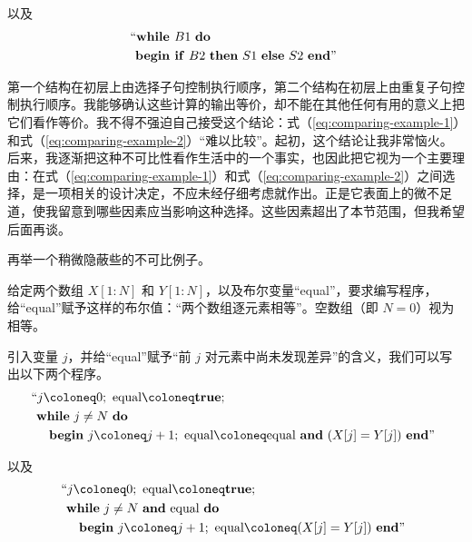 \documentclass[twoside,11pt,fontset=none]{ctexbook}
\begin{document}
\noindent
以及
\begin{equation}
	\label{eq:comparing-example-2}
	\begin{split}
		&\text{\hspace{-.4em}``\textbf{while }} B1\text{ \textbf{do}}\\
		&\text{\textbf{begin if} } B2\text{ \textbf{then} } S1\text{ \textbf{else} } S2\text{ \textbf{end}''}
	\end{split}
\end{equation}

\label{pg:dilema}
第一个结构在初层上由选择子句控制执行顺序，第二个结构在初层上由重复子句控制执行顺序。我能够确认这些计算的输出等价，却不能在其他任何有用的意义上把它们看作等价。我不得不强迫自己接受这个结论：式（\ref{eq:comparing-example-1}）和式（\ref{eq:comparing-example-2}）“难以比较”。起初，这个结论让我非常恼火。后来，我逐渐把这种不可比性看作生活中的一个事实，也因此把它视为一个主要理由：在式（\ref{eq:comparing-example-1}）和式（\ref{eq:comparing-example-2}）之间选择，是一项相关的设计决定，不应未经仔细考虑就作出。正是它表面上的微不足道，使我留意到哪些因素应当影响这种选择。这些因素超出了本节范围，但我希望后面再谈。

再举一个稍微隐蔽些的不可比例子。

给定两个数组 $X[1:N]$ 和 $Y[1:N]$，以及布尔变量“equal”，要求编写程序，给“equal”赋予这样的布尔值：“两个数组逐元素相等”。空数组（即 $N = 0$）视为相等。

引入变量 $j$，并给“equal”赋予“前 $j$ 对元素中尚未发现差异”的含义，我们可以写出以下两个程序。
\begin{equation}
	\label{eq:comparing-example-3}
	\begin{split}
		&\text{\hspace{-.4em}``}j \coloneq 0;\text{ equal} \coloneq \text{\textbf{true}};\\
		&\text{\textbf{while} } j \neq N\text{ \textbf{do}}\\
		&\quad\text{\textbf{begin} } j \coloneq  j + 1;\text{ equal} \coloneq \text{equal \textbf{and} } (X[j] = Y[j]) \text{ \textbf{end}''}
	\end{split}
\end{equation}

\noindent
以及
\begin{equation}
	\label{eq:comparing-example-4}
	\begin{split}
		&\text{\hspace{-.4em}``}j \coloneq 0;\text{ equal} \coloneq \text{\textbf{true}};\\
		&\text{\textbf{while} } j \neq N\text{ \textbf{and} equal \textbf{do}}\\
		&\quad\text{\textbf{begin} } j \coloneq  j + 1;\text{ equal} \coloneq (X[j] = Y[j]) \text{ \textbf{end}''}
	\end{split}
\end{equation}
\end{document}
